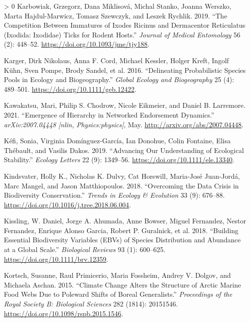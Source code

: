 \documentclass[11pt]{article}
\newlength{\cslhangindent}
\newenvironment{CSLReferences}[3] %
 {%
  \setlength{\parindent}{0pt}
  \ifodd #1 \everypar{\setlength{\hangindent}{\cslhangindent}}\ignorespaces\fi
  \ifnum #2 > 0
  \setlength{\parskip}{#2\baselineskip}
  \fi
 }%
 {}
\begin{document}
\begin{CSLReferences}{1}{0}
\leavevmode\hypertarget{ref-Karbowiak2019ComImm}{}%
Karbowiak, Grzegorz, Dana Miklisová, Michal Stanko, Joanna Werszko,
Marta Hajdul-Marwicz, Tomasz Szewczyk, and Leszek Rychlik. 2019. {``The
Competition Between Immatures of Ixodes Ricinus and Dermacentor
Reticulatus (Ixodida: Ixodidae) Ticks for Rodent Hosts.''} \emph{Journal
of Medical Entomology} 56 (2): 448--52.
\url{https://doi.org/10.1093/jme/tjy188}.

\leavevmode\hypertarget{ref-Karger2016DelPro}{}%
Karger, Dirk Nikolaus, Anna F. Cord, Michael Kessler, Holger Kreft,
Ingolf Kühn, Sven Pompe, Brody Sandel, et al. 2016. {``Delineating
Probabilistic Species Pools in Ecology and Biogeography.''} \emph{Global
Ecology and Biogeography} 25 (4): 489--501.
\url{https://doi.org/10.1111/geb.12422}.

\leavevmode\hypertarget{ref-Kawakatsu2021EmeHie}{}%
Kawakatsu, Mari, Philip S. Chodrow, Nicole Eikmeier, and Daniel B.
Larremore. 2021. {``Emergence of Hierarchy in Networked Endorsement
Dynamics.''} \emph{arXiv:2007.04448 {[}nlin, Physics:physics{]}}, May.
\url{http://arxiv.org/abs/2007.04448}.

\leavevmode\hypertarget{ref-Kefi2019AdvOur}{}%
Kéfi, Sonia, Virginia Domínguez-García, Ian Donohue, Colin Fontaine,
Elisa Thébault, and Vasilis Dakos. 2019. {``Advancing Our Understanding
of Ecological Stability.''} \emph{Ecology Letters} 22 (9): 1349--56.
\url{https://doi.org/10.1111/ele.13340}.

\leavevmode\hypertarget{ref-Kindsvater2018OveDat}{}%
Kindsvater, Holly K., Nicholas K. Dulvy, Cat Horswill, Maria-José
Juan-Jordá, Marc Mangel, and Jason Matthiopoulos. 2018. {``Overcoming
the Data Crisis in Biodiversity Conservation.''} \emph{Trends in Ecology
\& Evolution} 33 (9): 676--88.
\url{https://doi.org/10.1016/j.tree.2018.06.004}.

\leavevmode\hypertarget{ref-Kissling2018BuiEss}{}%
Kissling, W. Daniel, Jorge A. Ahumada, Anne Bowser, Miguel Fernandez,
Nestor Fernandez, Enrique Alonso Garcia, Robert P. Guralnick, et al.
2018. {``Building Essential Biodiversity Variables (EBVs) of Species
Distribution and Abundance at a Global Scale.''} \emph{Biological
Reviews} 93 (1): 600--625. \url{https://doi.org/10.1111/brv.12359}.

\leavevmode\hypertarget{ref-Kortsch2015CliCha}{}%
Kortsch, Susanne, Raul Primicerio, Maria Fossheim, Andrey V. Dolgov, and
Michaela Aschan. 2015. {``Climate Change Alters the Structure of Arctic
Marine Food Webs Due to Poleward Shifts of Boreal Generalists.''}
\emph{Proceedings of the Royal Society B: Biological Sciences} 282
(1814): 20151546. \url{https://doi.org/10.1098/rspb.2015.1546}.


\end{CSLReferences}
\end{document}

